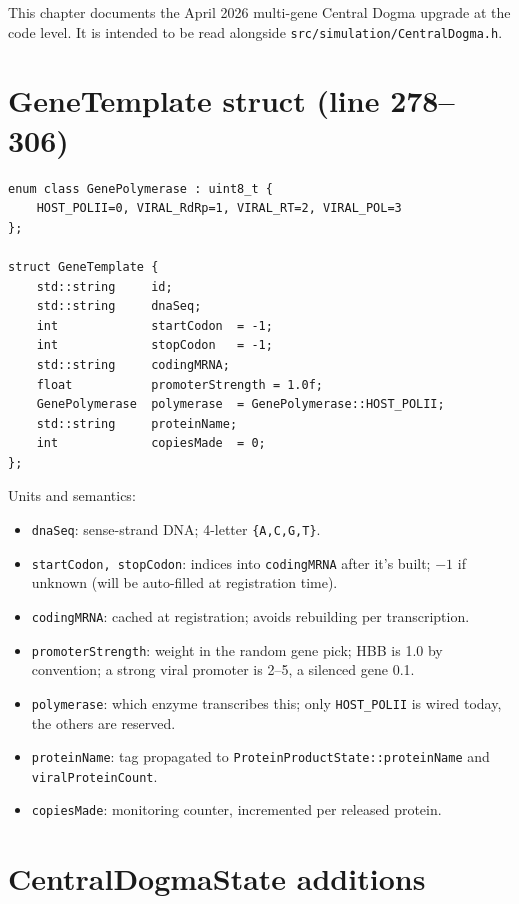 \documentclass[11pt,letterpaper,twoside,openany]{book}
\newcommand{\code}[1]{\texttt{#1}}
\newcommand{\file}[1]{\texttt{\small#1}}
\begin{document}
This chapter documents the April 2026 multi-gene Central Dogma
upgrade at the code level. It is intended to be read alongside
\file{src/simulation/CentralDogma.h}.

\section{GeneTemplate struct (line 278--306)}

\begin{lstlisting}
enum class GenePolymerase : uint8_t {
    HOST_POLII=0, VIRAL_RdRp=1, VIRAL_RT=2, VIRAL_POL=3
};

struct GeneTemplate {
    std::string     id;
    std::string     dnaSeq;
    int             startCodon  = -1;
    int             stopCodon   = -1;
    std::string     codingMRNA;
    float           promoterStrength = 1.0f;
    GenePolymerase  polymerase  = GenePolymerase::HOST_POLII;
    std::string     proteinName;
    int             copiesMade  = 0;
};
\end{lstlisting}

Units and semantics:
\begin{itemize}
  \item \code{dnaSeq}: sense-strand DNA; 4-letter \texttt{\{A,C,G,T\}}.
  \item \code{startCodon, stopCodon}: indices into \code{codingMRNA}
        after it's built; $-1$ if unknown (will be auto-filled at
        registration time).
  \item \code{codingMRNA}: cached at registration; avoids rebuilding
        per transcription.
  \item \code{promoterStrength}: weight in the random gene pick; HBB
        is 1.0 by convention; a strong viral promoter is 2--5, a
        silenced gene 0.1.
  \item \code{polymerase}: which enzyme transcribes this; only
        \code{HOST\_POLII} is wired today, the others are reserved.
  \item \code{proteinName}: tag propagated to
        \code{ProteinProductState::proteinName} and
        \code{viralProteinCount}.
  \item \code{copiesMade}: monitoring counter, incremented per
        released protein.
\end{itemize}

\section{CentralDogmaState additions}
\end{document}
